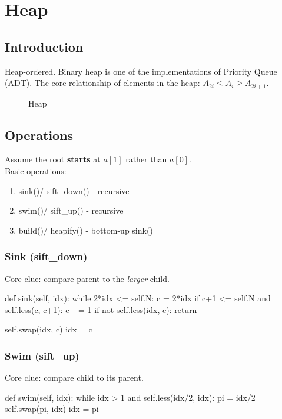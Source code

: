 \chapter{Heap}

\section{Introduction}
Heap-ordered. Binary heap is one of the implementations of Priority Queue (ADT). The core relationship of elements in the heap:
$A_{2i} \leq A_{i} \geq A_{2i+1}$.


\begin{figure}[hbtp]
\centering
{}
\caption{Heap}
\label{fig:heap}
\end{figure}
\section{Operations}
Assume the root \textbf{starts} at $a[1]$ rather than $a[0]$.
\\
Basic operations:
\begin{enumerate}
\item sink()/ sift\_down() - recursive
\item swim()/ sift\_up() - recursive
\item build()/ heapify() - bottom-up sink()
\end{enumerate}
\subsection{Sink (sift\_down)}
Core clue: compare parent to the \textit{larger} child. 
\begin{python}
def sink(self, idx):
    while 2*idx <= self.N:
        c = 2*idx
        if c+1 <= self.N and self.less(c, c+1):
            c += 1
        if not self.less(idx, c):
            return 

        self.swap(idx, c)
        idx = c
\end{python}

\subsection{Swim (sift\_up)}
Core clue: compare child to its parent. 
\begin{python}
def swim(self, idx):
    while idx > 1 and self.less(idx/2, idx):
        pi = idx/2
        self.swap(pi, idx)
        idx = pi
\end{python}
